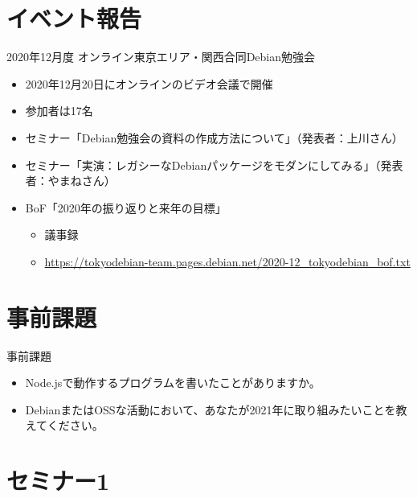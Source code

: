 \section{イベント報告}

\begin{frame}{2020年12月度 オンライン東京エリア・関西合同Debian勉強会}
\begin{itemize}
\item 2020年12月20日にオンラインのビデオ会議で開催
\item 参加者は17名
\item セミナー「Debian勉強会の資料の作成方法について」（発表者：上川さん）
\item セミナー「実演：レガシーなDebianパッケージをモダンにしてみる」（発表者：やまねさん）
\item BoF「2020年の振り返りと来年の目標」
  \begin{itemize}
  \item 議事録
  \item \url{https://tokyodebian-team.pages.debian.net/2020-12_tokyodebian_bof.txt}
  \end{itemize}
\end{itemize}
\end{frame}


\section{事前課題}


\begin{frame}{事前課題}
  \begin{itemize}
  \item Node.jsで動作するプログラムを書いたことがありますか。
  \item DebianまたはOSSな活動において、あなたが2021年に取り組みたいことを教えてください。
  \end{itemize}
\end{frame}

{\footnotesize
 
}

%

\section{セミナー1}

